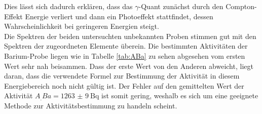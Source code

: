 Dies lässt sich dadurch erklären, dass das $\gamma$-Quant zunächst durch den Compton-Effekt Energie verliert und dann ein Photoeffekt stattfindet, dessen Wahrscheinlichkeit bei geringeren Energien steigt.\\
Die Spektren der beiden untersuchten unbekannten Proben stimmen gut mit den Spektren der zugeordneten Elemente überein. 
Die bestimmten Aktivitäten der Barium-Probe liegen wie in Tabelle \ref{tab:ABa} zu sehen abgesehen vom ersten Wert sehr nah beisammen. Dass der erste Wert von den Anderen abweicht, liegt daran, dass die verwendete Formel zur Bestimmung der Aktivität in diesem Energiebereich noch nicht gültig ist. Der Fehler auf den gemittelten Wert der Aktivität $A_.{Ba}=\SI{1263(9)}{\becquerel}$ ist somit gering, weshalb es sich um eine geeignete Methode zur Aktivitätsbestimmung zu handeln scheint. 